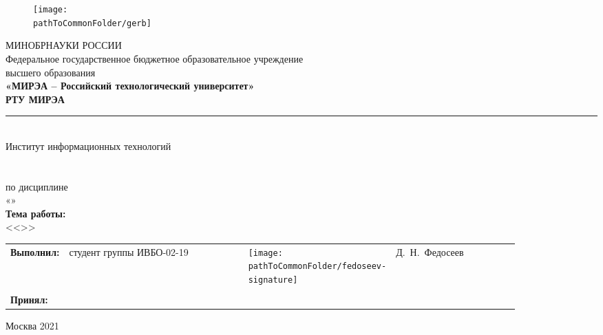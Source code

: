 

\renewcommand{\studentfio}{Д.~Н.~Федосеев}
\begin{center}
	\begin{figure}[h!]
		\begin{center}
		\texttt{[image: \\pathToCommonFolder/gerb]}
		\end{center}	
	\end{figure}
 	\small	МИНОБРНАУКИ РОССИИ \\
	Федеральное государственное бюджетное образовательное учреждение\\
						высшего образования\\
\normalsize					
\textbf{«МИРЭА – Российский технологический университет»\\
						РТУ МИРЭА}\\
						\noindent\rule{1\linewidth}{1pt}\\
       Институт информационных технологий\\ %
					\kafedra\\
		\vspace{3ex}
			\large \textbf{\workname}  \\
						по дисциплине\\ «\discipline» \\
		\vspace{3ex}
		\if \withouttheme
			\textbf{Тема работы:}\\ <<\theme>>
		\fi
\vspace{6ex}
\small
\begin{table}[h!]
\begin{tabular}{lp{0.4\linewidth}p{0.2\linewidth}p{0.26\linewidth}}
	\textbf{Выполнил:} & студент группы ИВБО-02-19 & \hfill \texttt{[image: \\pathToCommonFolder/fedoseev-signature]}& \studentfio \\ \\%
	\textbf{Принял:} & \multicolumn{2}{l}{\rang} &  \teacherfio \\
\end{tabular}
\end{table}
\end{center}

\normalsize
\begin{center}	
\vfill 
Москва 2021
\end{center}
